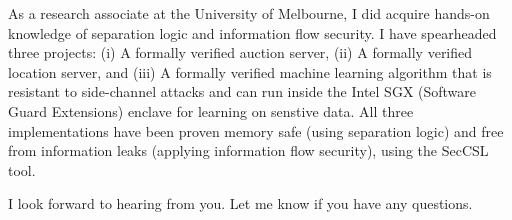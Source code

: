 \documentclass[11pt,a4paper,roman]{moderncv}
\begin{document}
As a research associate at the University of Melbourne, I did
 acquire hands-on knowledge of separation logic and information flow
 security. I have spearheaded three projects:
 (i) A formally verified auction server, (ii) A formally
 verified location server, and (iii) A formally verified machine learning 
 algorithm that is resistant to side-channel attacks and can  
 run inside the Intel SGX (Software Guard Extensions) enclave for learning
 on senstive data. All three implementations have been proven 
 memory safe (using separation logic) and free from information
 leaks (applying information flow security), using the SecCSL tool.

\vspace{0.5cm}
I look forward to hearing from you. Let me know if you have any questions. \\
 

\vspace{0.5cm}


\makeletterclosing
\end{document}
